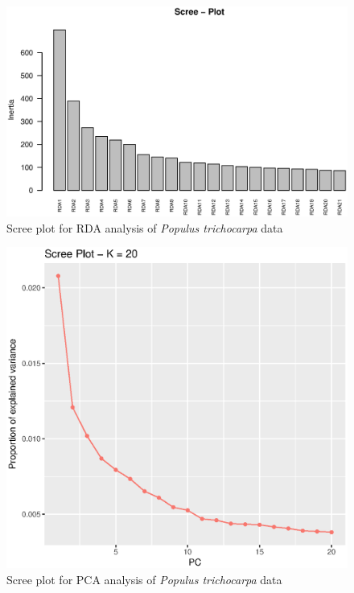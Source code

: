 \documentclass[a4paper,times,10pt,authoryear]{article}%
\begin{document}



\begin{figure}[t]
\begin{center}
\includegraphics[height=0.25\textheight]{figures/screeplot-rda.eps}
\end{center}
\caption{Scree plot for RDA analysis of \textit{Populus trichocarpa} data}%
\label{fig:screeplotrda}%
\end{figure}


\begin{figure}[t]
\begin{center}
\includegraphics[height=0.25\textheight]{figures/screeplot-pca.eps}
\end{center}
\caption{Scree plot for PCA analysis of \textit{Populus trichocarpa} data}%
\label{fig:screeplotpca}%
\end{figure}
\end{document}
